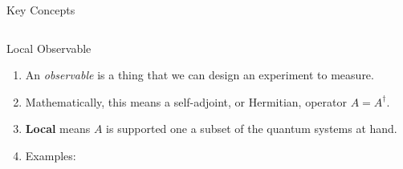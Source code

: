 \documentclass[11pt,aspectratio=1610,xcolor=dvipsnames]{beamer}
\begin{document}
\begin{frame}{Key Concepts}
	\begin{columns}
		\begin{column}[t]{0.5\textwidth}
			{\Large Local Observable}
			\begin{enumerate}
				\item An \emph{observable} is a thing that we can design an experiment to measure.
				\item Mathematically, this means a self-adjoint, or Hermitian, operator $A = A^\dag$.
				\item \textbf{Local} means $A$ is supported one a subset of the quantum systems at hand.
				\item Examples:
			\end{enumerate}
		\end{column}
	\end{columns}
\end{frame}
\end{document}
